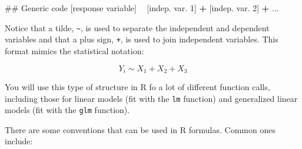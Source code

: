 \documentclass[]{book}
\makeatletter
\newenvironment{Shaded}{\begin{snugshade}}{\end{snugshade}}
\newcommand{\DecValTok}[1]{\textcolor[rgb]{0.00,0.00,0.81}{#1}}
\newcommand{\StringTok}[1]{\textcolor[rgb]{0.31,0.60,0.02}{#1}}
\newcommand{\OperatorTok}[1]{\textcolor[rgb]{0.81,0.36,0.00}{\textbf{#1}}}
\newcommand{\NormalTok}[1]{#1}
\newenvironment{kframe}{%
\medskip{}
\setlength{\fboxsep}{.8em}
 \def\at@end@of@kframe{}%
 \ifinner\ifhmode%
  \def\at@end@of@kframe{\end{minipage}}%
  \begin{minipage}{\columnwidth}%
 \fi\fi%
 \def\FrameCommand##1{\hskip\@totalleftmargin \hskip-\fboxsep
 \colorbox{shadecolor}{##1}\hskip-\fboxsep
     \hskip-\linewidth \hskip-\@totalleftmargin \hskip\columnwidth}%
 \MakeFramed {\advance\hsize-\width
   \@totalleftmargin\z@ \linewidth\hsize
   \@setminipage}}%
 {\par\unskip\endMakeFramed%
 \at@end@of@kframe}
\renewenvironment{Shaded}{\begin{kframe}}{\end{kframe}}
\theoremstyle{definition}
\theoremstyle{definition}
\theoremstyle{definition}
\theoremstyle{remark}
\makeatother
\begin{document}
\begin{Shaded}
\begin{Highlighting}[]
\NormalTok{## Generic code}
\NormalTok{[response variable] }\OperatorTok{~}\StringTok{ }\NormalTok{[indep. var. }\DecValTok{1}\NormalTok{] }\OperatorTok{+}\StringTok{  }\NormalTok{[indep. var. }\DecValTok{2}\NormalTok{] }\OperatorTok{+}\StringTok{ }\NormalTok{...}
\end{Highlighting}
\end{Shaded}

Notice that a tilde, \texttt{\textasciitilde{}}, is used to separate the
independent and dependent variables and that a plus sign, \texttt{+}, is
used to join independent variables. This format mimics the statistical
notation:

\[
Y_i \sim X_1 + X_2 + X_3
\]

You will use this type of structure in R fo a lot of different function
calls, including those for linear models (fit with the \texttt{lm}
function) and generalized linear models (fit with the \texttt{glm}
function).

There are some conventions that can be used in R formulas. Common ones
include:
\end{document}
